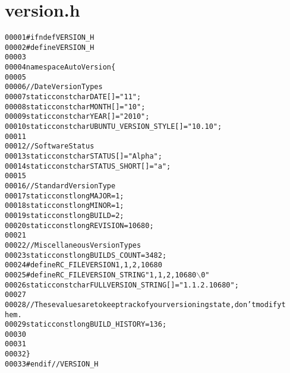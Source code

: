 \hypertarget{version_8h_source}{
\section{version.h}
}


\begin{footnotesize}\begin{alltt}
00001 \textcolor{preprocessor}{#ifndef VERSION\_H}
00002 \textcolor{preprocessor}{}\textcolor{preprocessor}{#define VERSION\_H}
00003 \textcolor{preprocessor}{}
00004 \textcolor{keyword}{namespace }AutoVersion\{
00005         
00006         \textcolor{comment}{//Date Version Types}
00007         \textcolor{keyword}{static} \textcolor{keyword}{const} \textcolor{keywordtype}{char} DATE[] = \textcolor{stringliteral}{"11"};
00008         \textcolor{keyword}{static} \textcolor{keyword}{const} \textcolor{keywordtype}{char} MONTH[] = \textcolor{stringliteral}{"10"};
00009         \textcolor{keyword}{static} \textcolor{keyword}{const} \textcolor{keywordtype}{char} YEAR[] = \textcolor{stringliteral}{"2010"};
00010         \textcolor{keyword}{static} \textcolor{keyword}{const} \textcolor{keywordtype}{char} UBUNTU\_VERSION\_STYLE[] = \textcolor{stringliteral}{"10.10"};
00011         
00012         \textcolor{comment}{//Software Status}
00013         \textcolor{keyword}{static} \textcolor{keyword}{const} \textcolor{keywordtype}{char} STATUS[] = \textcolor{stringliteral}{"Alpha"};
00014         \textcolor{keyword}{static} \textcolor{keyword}{const} \textcolor{keywordtype}{char} STATUS\_SHORT[] = \textcolor{stringliteral}{"a"};
00015         
00016         \textcolor{comment}{//Standard Version Type}
00017         \textcolor{keyword}{static} \textcolor{keyword}{const} \textcolor{keywordtype}{long} MAJOR = 1;
00018         \textcolor{keyword}{static} \textcolor{keyword}{const} \textcolor{keywordtype}{long} MINOR = 1;
00019         \textcolor{keyword}{static} \textcolor{keyword}{const} \textcolor{keywordtype}{long} BUILD = 2;
00020         \textcolor{keyword}{static} \textcolor{keyword}{const} \textcolor{keywordtype}{long} REVISION = 10680;
00021         
00022         \textcolor{comment}{//Miscellaneous Version Types}
00023         \textcolor{keyword}{static} \textcolor{keyword}{const} \textcolor{keywordtype}{long} BUILDS\_COUNT = 3482;
00024 \textcolor{preprocessor}{        #define RC\_FILEVERSION 1,1,2,10680}
00025 \textcolor{preprocessor}{}\textcolor{preprocessor}{        #define RC\_FILEVERSION\_STRING "1, 1, 2, 10680\(\backslash\)0"}
00026 \textcolor{preprocessor}{}        \textcolor{keyword}{static} \textcolor{keyword}{const} \textcolor{keywordtype}{char} FULLVERSION\_STRING[] = \textcolor{stringliteral}{"1.1.2.10680"};
00027         
00028         \textcolor{comment}{//These values are to keep track of your versioning state, don't modify t
      hem.}
00029         \textcolor{keyword}{static} \textcolor{keyword}{const} \textcolor{keywordtype}{long} BUILD\_HISTORY = 136;
00030         
00031 
00032 \}
00033 \textcolor{preprocessor}{#endif //VERSION\_H}
\end{alltt}\end{footnotesize}
